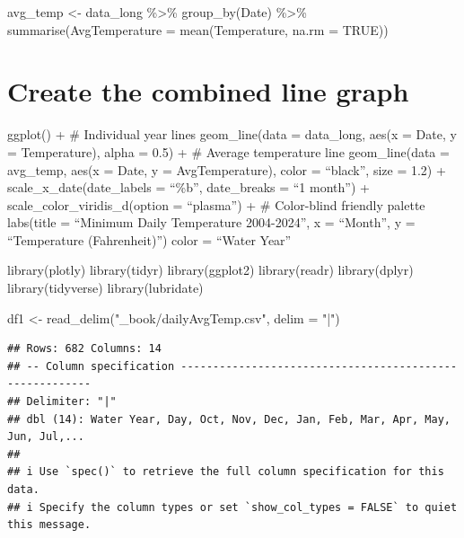 \documentclass[
]{book}
\newenvironment{Shaded}{\begin{snugshade}}{\end{snugshade}}
\newcommand{\AttributeTok}[1]{\textcolor[rgb]{0.77,0.63,0.00}{#1}}
\newcommand{\FunctionTok}[1]{\textcolor[rgb]{0.00,0.00,0.00}{#1}}
\newcommand{\NormalTok}[1]{#1}
\newcommand{\OtherTok}[1]{\textcolor[rgb]{0.56,0.35,0.01}{#1}}
\newcommand{\StringTok}[1]{\textcolor[rgb]{0.31,0.60,0.02}{#1}}
\theoremstyle{definition}
\theoremstyle{definition}
\theoremstyle{definition}
\theoremstyle{definition}
\theoremstyle{remark}
\begin{document}
avg\_temp \textless- data\_long \%\textgreater\%
group\_by(Date) \%\textgreater\%
summarise(AvgTemperature = mean(Temperature, na.rm = TRUE))

\hypertarget{create-the-combined-line-graph}{%
\chapter{Create the combined line graph}\label{create-the-combined-line-graph}}

ggplot() +
\# Individual year lines
geom\_line(data = data\_long,
aes(x = Date, y = Temperature),
alpha = 0.5) +
\# Average temperature line
geom\_line(data = avg\_temp,
aes(x = Date, y = AvgTemperature),
color = ``black'', size = 1.2) +
scale\_x\_date(date\_labels = ``\%b'', date\_breaks = ``1 month'') +
scale\_color\_viridis\_d(option = ``plasma'') + \# Color-blind friendly palette
labs(title = ``Minimum Daily Temperature 2004-2024'',
x = ``Month'',
y = ``Temperature (Fahrenheit)'')
color = ``Water Year''

\begin{Shaded}
\begin{Highlighting}[]
\FunctionTok{library}\NormalTok{(plotly)}
\FunctionTok{library}\NormalTok{(tidyr)}
\FunctionTok{library}\NormalTok{(ggplot2)}
\FunctionTok{library}\NormalTok{(readr)}
\FunctionTok{library}\NormalTok{(dplyr)}
\FunctionTok{library}\NormalTok{(tidyverse)}
\FunctionTok{library}\NormalTok{(lubridate)}

\NormalTok{df1 }\OtherTok{\textless{}{-}} \FunctionTok{read\_delim}\NormalTok{(}\StringTok{"\_book/dailyAvgTemp.csv"}\NormalTok{, }\AttributeTok{delim =} \StringTok{"|"}\NormalTok{)}
\end{Highlighting}
\end{Shaded}

\begin{verbatim}
## Rows: 682 Columns: 14
## -- Column specification --------------------------------------------------------
## Delimiter: "|"
## dbl (14): Water Year, Day, Oct, Nov, Dec, Jan, Feb, Mar, Apr, May, Jun, Jul,...
## 
## i Use `spec()` to retrieve the full column specification for this data.
## i Specify the column types or set `show_col_types = FALSE` to quiet this message.
\end{verbatim}
\end{document}
